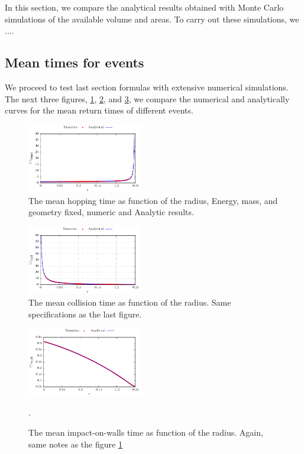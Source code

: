 \documentclass[superscriptaddress,pre,reprint,showpacs,onecolumn]{revtex4-1}
\begin{document}
In this section, we compare the analytical results obtained with Monte Carlo simulations of the available volume and areas. To carry out these simulations, we ....

\subsection{Mean times for events}

We proceed to test last section formulas with
extensive numerical simulations.
The next three figures, \ref{MeanHopp01}, \ref{MeanCol01}, and \ref{MeanImp01},  
we compare the
numerical and analytically curves for the mean return times of different events.

\begin{figure}[h]
  \centering
  \includegraphics[width=0.45\textwidth]{./FigurasPerfectas/HopTimes02.pdf}
  \caption{The mean hopping time as function of the radius, Energy, mass, 
and geometry fixed, numeric and Analytic results.}\label{MeanHopp01}
\end{figure}

\begin{figure}[h]
  \centering
  \includegraphics[width=0.45\textwidth]{./FigurasPerfectas/CollitionTimes02.pdf}
  \caption{The mean collision time as function of the radius. Same
    specifications as the last figure. }\label{MeanCol01}
\end{figure}


\begin{figure}[h]
  \centering
  \includegraphics[width=0.45\textwidth]{./FigurasPerfectas/ImpactWall02.pdf}
  \caption{The mean impact-on-walls time as function of the radius. Again, same
    notes as the figure \ref{MeanHopp01}}\label{MeanImp01}.
\end{figure}
\end{document}
